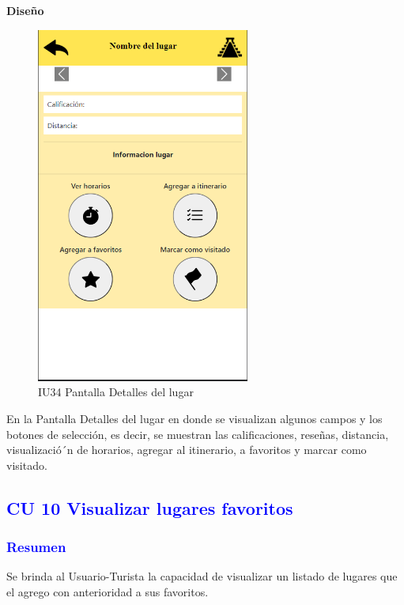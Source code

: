 \textbf{Diseño}
\begin{figure}[h]
        \centering
        \includegraphics[width= 7cm]{entregable final/pantallasSistema/IU34 Pantalla Detalles del lugar.png}
        \caption{IU34 Pantalla Detalles del lugar}
        \label{fig:enter-label}
    \end{figure}
 

En la Pantalla Detalles del lugar en donde se visualizan algunos campos y los botones de selección, es decir, se muestran las calificaciones, reseñas, distancia, visualizació´n de horarios, agregar al itinerario, a favoritos y marcar como visitado.
\newpage


\pagebreak
\subsection{\textcolor{blue}{CU 10 Visualizar lugares favoritos}}

\subsubsection{\textcolor{blue}{Resumen}}{
Se brinda al Usuario-Turista la capacidad de visualizar un listado de lugares
que el agrego con anterioridad a sus favoritos.
}

